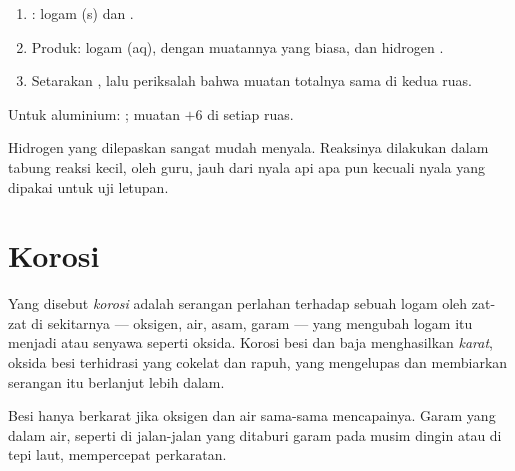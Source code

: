 \begin{method}\label{met:g9:metals-acids-corrosion:write}
\begin{enumerate}
  \item {}: logam (s) dan  .
  \item Produk:  logam (aq), dengan muatannya yang biasa, dan
        hidrogen .
  \item Setarakan , lalu periksalah bahwa muatan totalnya
        sama di kedua ruas.
\end{enumerate}
Untuk aluminium: ; muatan
$+6$ di setiap ruas.
\end{method}

\begin{safety}{}
Hidrogen yang dilepaskan sangat mudah menyala. Reaksinya dilakukan dalam
tabung reaksi kecil, oleh guru, jauh dari nyala api apa pun kecuali
nyala yang dipakai untuk uji letupan.
\end{safety}

\section{Korosi}

\begin{definition}\label{def:g9:metals-acids-corrosion:corrosion}
Yang disebut \emph{korosi} adalah serangan perlahan
terhadap sebuah logam oleh zat-zat di sekitarnya --- oksigen, air,
asam, garam --- yang mengubah logam itu menjadi  atau senyawa
seperti oksida. Korosi besi dan baja menghasilkan
\emph{karat}, oksida besi terhidrasi yang cokelat dan
rapuh, yang mengelupas dan membiarkan serangan itu berlanjut lebih
dalam.
\end{definition}

\begin{proposition}\label{prop:g9:metals-acids-corrosion:needs}
Besi hanya berkarat jika oksigen dan air sama-sama mencapainya. Garam
yang  dalam air, seperti di jalan-jalan yang ditaburi garam pada
musim dingin atau di tepi laut, mempercepat perkaratan.
\end{proposition}

